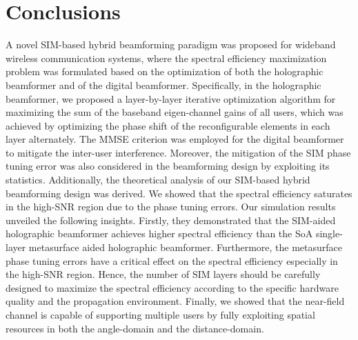 \documentclass[lettersize,journal]{IEEEtran}
\theoremstyle{remark}
\begin{document}
\section{Conclusions}\label{Conclusion}
A novel SIM-based hybrid beamforming paradigm was proposed for wideband wireless communication systems, where the spectral efficiency maximization problem was formulated based on the optimization of both the holographic beamformer and of the digital beamformer. Specifically, in the holographic beamformer, we proposed a layer-by-layer iterative optimization algorithm for maximizing the sum of the baseband eigen-channel gains of all users, which was achieved by optimizing the phase shift of the reconfigurable elements in each layer alternately. The MMSE criterion was employed for the digital beamformer to mitigate the inter-user interference. Moreover, the mitigation of the SIM phase tuning error was also considered in the beamforming design by exploiting its statistics. Additionally, the theoretical analysis of our SIM-based hybrid beamforming design was derived. We showed that the spectral efficiency saturates in the high-SNR region due to the phase tuning errors. Our simulation results unveiled the following insights. Firstly, they demonstrated that the SIM-aided holographic beamformer achieves higher spectral efficiency than the SoA single-layer metasurface aided holographic beamformer. Furthermore, the metasurface phase tuning errors have a critical effect on the spectral efficiency especially in the high-SNR region. Hence, the number of SIM layers should be carefully designed to maximize the spectral efficiency according to the specific hardware quality and the propagation environment. Finally, we showed that the near-field channel is capable of supporting multiple users by fully exploiting spatial resources in both the angle-domain and the distance-domain.


\appendices
\end{document}
